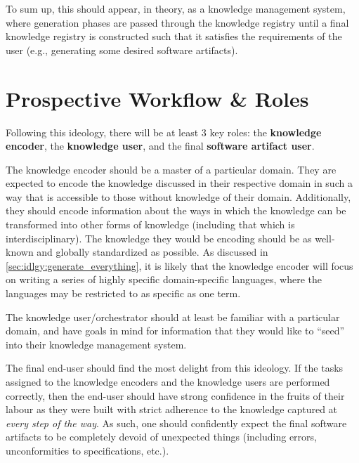 To sum up, this should appear, in theory, as a knowledge management
system, where generation phases are passed through the knowledge
registry until a final knowledge registry is constructed such that it satisfies
the requirements of the user (e.g., generating some desired software artifacts).

\section{Prospective Workflow \& Roles}\label{sec:idlgy:prospective_workflow}

Following this ideology, there will be at least 3 key roles: the
\textbf{knowledge encoder}, the \textbf{knowledge user}, and the final
\textbf{software artifact user}. 

The knowledge encoder should be a master of a particular domain. They are
expected to encode the knowledge discussed in their respective domain in such a
way that is accessible to those without knowledge of their domain. Additionally,
they should encode information about the ways in which the knowledge can be
transformed into other forms of knowledge (including that which is
interdisciplinary). The knowledge they would be encoding should be as well-known
and globally standardized as possible. As discussed in
\autoref{sec:idlgy:generate_everything}, it is likely that the knowledge encoder
will focus on writing a series of highly specific domain-specific languages,
where the languages may be restricted to as specific as one term.

The knowledge user/orchestrator should at least be familiar with a particular
domain, and have goals in mind for information that they would like to ``seed''
into their knowledge management system. 

The final end-user should find the most delight from this ideology. If the tasks
assigned to the knowledge encoders and the knowledge users are performed
correctly, then the end-user should have strong confidence in the fruits of
their labour as they were built with strict adherence to the knowledge captured
at \textit{every step of the way}. As such, one should confidently expect the
final software artifacts to be completely devoid of unexpected things (including
errors, unconformities to specifications, etc.).

